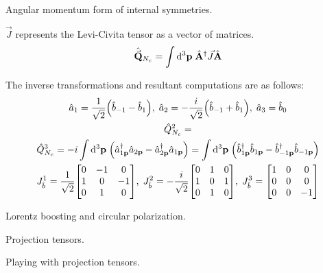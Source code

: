 \documentclass{report}
\begin{document}
\begin{subquests}
	\item Angular momentum form of internal symmetries.
	\begin{subquests}
		\item
		$\vec{J}$ represents the Levi-Civita tensor as a vector of matrices.
		\begin{gather*}
			\hat{\vec{{\vb Q}}}_{N_c} = \int \dd^3{\vb p}\;\hat{\vb A}^{\dagger}\vec{J}\hat{\vb A} 
		\end{gather*}

		\item
		The inverse transformations and resultant computations are as follows:
		\begin{gather*}
			\hat{a}_1 = \frac{1}{\sqrt 2}\pqty{\hat{b}_{-1} - \hat{b}_1},\; \hat{a}_2 = -\frac{i}{\sqrt 2}\pqty{\hat{b}_{-1} + \hat{b}_{1}},\; \hat{a}_3 = \hat{b}_0 \\
			\hat{Q}^{2}_{N_c} = \\
			\hat{Q}^{3}_{N_c} = -i\int \dd^3{\vb p}\;\pqty{\hat{a}_{1\vb p}^{\dagger}\hat{a}_{2\vb p} - \hat{a}^{\dagger}_{2 \vb p}\hat{a}_{1\vb p}} = \int \dd^3{\vb p}\;\pqty{\hat{b}^{\dagger}_{1\vb p}\hat{b}_{1\vb p} - \hat{b}^{\dagger}_{-1\vb p}\hat{b}_{-1\vb p}} \\
			J_{\hat{b}}^1 = \frac{1}{\sqrt 2}
			\mqty[
				0 & -1 & 0 \\
				1 & 0 & -1 \\
				0 & 1 & 0
			],\;
			J_{\hat{b}}^2 = -\frac{i}{\sqrt 2}
			\mqty[
				0 & 1 & 0 \\
				1 & 0 & 1 \\
				0 & 1 & 0	
			],\;
			J_{\hat{b}}^3 = 
			\mqty[
				1 & 0 & 0 \\
				0 & 0 & 0 \\
				0 & 0 & -1	
			] 
		\end{gather*}
	\end{subquests}
	
	\item Lorentz boosting and circular polarization.
	\begin{subquests}
		\item

		\item

		\item
	\end{subquests}

	\item Projection tensors.

	\item Playing with projection tensors.
\end{subquests}
\end{document}
